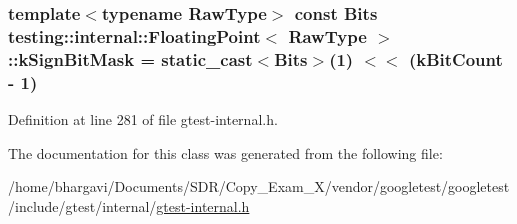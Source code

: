 \subsubsection[{\texorpdfstring{k\+Sign\+Bit\+Mask}{kSignBitMask}}]{\setlength{\rightskip}{0pt plus 5cm}template$<$typename Raw\+Type$>$ const {\bf Bits} {\bf testing\+::internal\+::\+Floating\+Point}$<$ Raw\+Type $>$\+::k\+Sign\+Bit\+Mask = static\+\_\+cast$<${\bf Bits}$>$(1) $<$$<$ ({\bf k\+Bit\+Count} -\/ 1)\hspace{0.3cm}{\ttfamily [static]}}\hypertarget{classtesting_1_1internal_1_1_floating_point_aca98b5ea6f2222a66a82e52421682efa}{}\label{classtesting_1_1internal_1_1_floating_point_aca98b5ea6f2222a66a82e52421682efa}


Definition at line 281 of file gtest-\/internal.\+h.



The documentation for this class was generated from the following file\+:\begin{DoxyCompactItemize}
\item 
/home/bhargavi/\+Documents/\+S\+D\+R/\+Copy\+\_\+\+Exam\+\_\+X/vendor/googletest/googletest/include/gtest/internal/\hyperlink{gtest-internal_8h}{gtest-\/internal.\+h}\end{DoxyCompactItemize}
